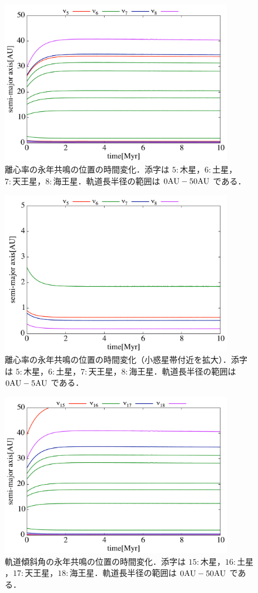 \documentclass[11pt,a4paper,oneside,onecolumn]{jreport}
\begin{document}
\begin{figure}[H]
\centering
\includegraphics[width=10cm]{./image/SecularResonanceAxis_ecc.pdf}
\caption{離心率の永年共鳴の位置の時間変化．添字は $5 : 木星$，$6 : 土星$，$7 : 天王星$，$8 : 海王星$．軌道長半径の範囲は $0 {\rm AU} - 50 {\rm AU}$ である．\label{fig:SecularResonanceAxis_ecc}}
\end{figure}

\begin{figure}[H]
\centering
\includegraphics[width=10cm]{./image/SecularResonanceAxis_ecc_upto5AU.pdf}
\caption{離心率の永年共鳴の位置の時間変化（小惑星帯付近を拡大）．添字は $5 : 木星$，$6 : 土星$，$7 : 天王星$，$8 : 海王星$．軌道長半径の範囲は $0 {\rm AU} - 5 {\rm AU}$ である．\label{fig:SecularResonanceAxis_ecc_upto5AU}}
\end{figure}

\begin{figure}[H]
\centering
\includegraphics[width=10cm]{./image/SecularResonanceAxis_inc.pdf}
\caption{軌道傾斜角の永年共鳴の位置の時間変化．添字は $15 : 木星$，$16 : 土星$，$17 : 天王星$，$18 : 海王星$．軌道長半径の範囲は $0 {\rm AU} - 50 {\rm AU}$ である．\label{fig:SecularResonanceAxis_inc}}
\end{figure}
\end{document}
